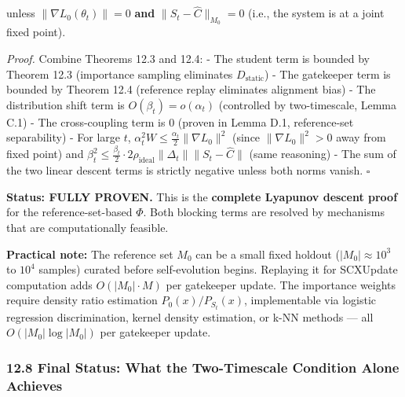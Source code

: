 \documentclass[
  12pt,
]{ctexart}
\begin{document}
unless \(\|\nabla L_0(\theta_t)\| = 0\) \textbf{and}
\(\|S_t - \hat{C}\|_{M_0} = 0\) (i.e., the system is at a joint fixed
point).

\emph{Proof.} Combine Theorems 12.3 and 12.4: - The student term is
bounded by Theorem 12.3 (importance sampling eliminates
\(D_{\text{static}}\)) - The gatekeeper term is bounded by Theorem 12.4
(reference replay eliminates alignment bias) - The distribution shift
term is \(O(\beta_t) = o(\alpha_t)\) (controlled by two-timescale, Lemma
C.1) - The cross-coupling term is \(0\) (proven in Lemma D.1,
reference-set separability) - For large \(t\),
\(\alpha_t^2 W \leq \frac{\alpha_t}{2} \|\nabla L_0\|^2\) (since
\(\|\nabla L_0\|^2 > 0\) away from fixed point) and
\(\beta_t^2 \leq \frac{\beta_t}{2} \cdot 2\rho_{\text{ideal}} \|\Delta_t\| \|S_t - \hat{C}\|\)
(same reasoning) - The sum of the two linear descent terms is strictly
negative unless both norms vanish. \(\square\)

\textbf{Status: FULLY PROVEN.} This is the \textbf{complete Lyapunov
descent proof} for the reference-set-based \(\Phi\). Both blocking terms
are resolved by mechanisms that are computationally feasible.

\textbf{Practical note:} The reference set \(M_0\) can be a small fixed
holdout (\(|M_0| \approx 10^3\) to \(10^4\) samples) curated before
self-evolution begins. Replaying it for SCXUpdate computation adds
\(O(|M_0| \cdot M)\) per gatekeeper update. The importance weights
require density ratio estimation \(P_0(x)/P_{S_t}(x)\), implementable
via logistic regression discrimination, kernel density estimation, or
k-NN methods --- all \(O(|M_0| \log |M_0|)\) per gatekeeper update.

\subsubsection{12.8 Final Status: What the Two-Timescale Condition Alone
Achieves}\label{final-status-what-the-two-timescale-condition-alone-achieves}
\end{document}
